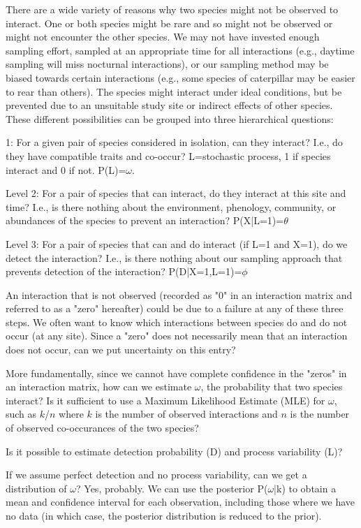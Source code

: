 There are a wide variety of reasons why two species might not be observed to interact. One or both species might be rare and so might not be observed or might not encounter the other species. We may not have invested enough sampling effort, sampled at an appropriate time for all interactions (e.g., daytime sampling will miss nocturnal interactions), or our sampling method may be biased towards certain interactions (e.g., some species of caterpillar may be easier to rear than others). The species might interact under ideal conditions, but be prevented due to an unsuitable study site or indirect effects of other species. These different possibilities can be grouped into three hierarchical questions:


1: For a given pair of species considered in isolation, can they interact? I.e., do they have compatible traits and co-occur?
L=stochastic process, 1 if species interact and 0 if not.
P(L)=$\omega$.


Level 2: For a pair of species that can interact, do they interact at this site and time? I.e., is there nothing about the environment, phenology, community, or abundances of the species to prevent an interaction?
P(X|L=1)=$\theta$


Level 3: For a pair of species that can and do interact (if L=1 and X=1), do we detect the interaction? I.e., is there nothing about our sampling approach that prevents detection of the interaction?
P(D|X=1,L=1)=$\phi$


An interaction that is not observed (recorded as "0" in an interaction matrix and referred to as a "zero" hereafter) could be due to a failure at any of these three steps. We often want to know which interactions between species do and do not occur (at any site). Since a "zero" does not necessarily mean that an interaction does not occur, can we put uncertainty on this entry?


More fundamentally, since we cannot have complete confidence in the "zeros" in an interaction matrix, how can we estimate $\omega$, the probability that two species interact? Is it sufficient to use a Maximum Likelihood Estimate (MLE) for $\omega$, such as $k$/$n$ where $k$ is the number of observed interactions and $n$ is the number of observed co-occurances of the two species?

Is it possible to estimate detection probability (D) and process variability (L)?

If we assume perfect detection and no process variability, can we get a distribution of $\omega$? Yes, probably. We can use the posterior P($\omega$|k) to obtain a mean and confidence interval for each observation, including those where we have no data (in which case, the posterior distribution is reduced to the prior).

